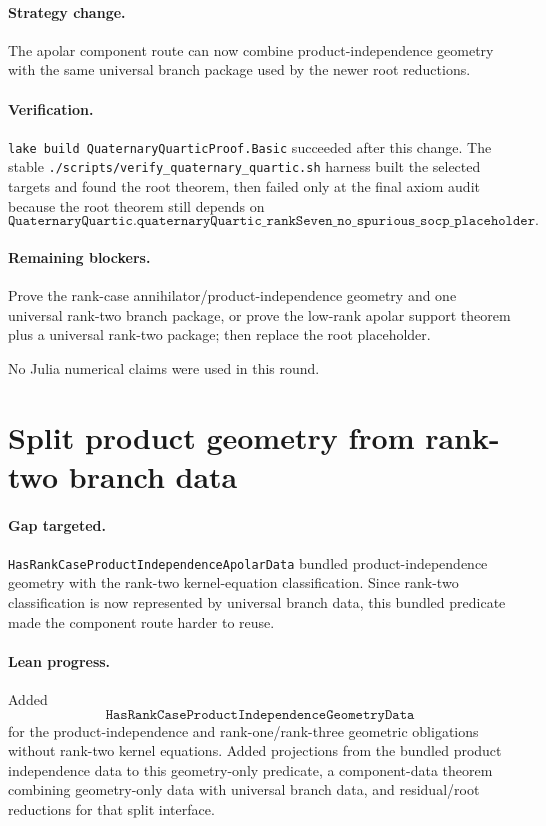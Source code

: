 \documentclass[11pt]{article}
\begin{document}
\paragraph{Strategy change.}
The apolar component route can now combine product-independence geometry with
the same universal branch package used by the newer root reductions.

\paragraph{Verification.}
\texttt{lake build QuaternaryQuarticProof.Basic} succeeded after this change.
The stable \texttt{./scripts/verify\_quaternary\_quartic.sh} harness built the
selected targets and found the root theorem, then failed only at the final axiom
audit because the root theorem still depends on
\[
\texttt{QuaternaryQuartic.quaternaryQuartic\_rankSeven\_no\_spurious\_socp\_placeholder}.
\]

\paragraph{Remaining blockers.}
Prove the rank-case annihilator/product-independence geometry and one universal
rank-two branch package, or prove the low-rank apolar support theorem plus a
universal rank-two package; then replace the root placeholder.

No Julia numerical claims were used in this round.

\section*{Split product geometry from rank-two branch data}

\paragraph{Gap targeted.}
\texttt{HasRankCaseProductIndependenceApolarData} bundled product-independence
geometry with the rank-two kernel-equation classification.  Since rank-two
classification is now represented by universal branch data, this bundled
predicate made the component route harder to reuse.

\paragraph{Lean progress.}
Added
\[
\texttt{HasRankCaseProductIndependenceGeometryData}
\]
for the product-independence and rank-one/rank-three geometric obligations
without rank-two kernel equations.  Added projections from the bundled product
independence data to this geometry-only predicate, a component-data theorem
combining geometry-only data with universal branch data, and residual/root
reductions for that split interface.
\end{document}
